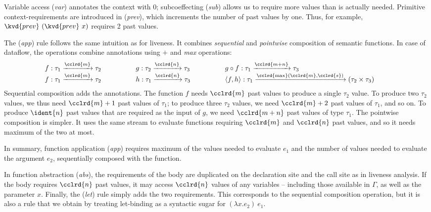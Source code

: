 Variable access (\emph{var}) annotates the context with $0$; subcoeffecting (\emph{sub}) allows
us to require more values than is actually needed. Primitive context-requirements are introduced
in (\emph{prev}), which increments the number of past values by one. Thus, for example,
$\kvd{prev}~(\kvd{prev}~x)$ requires 2 past values.

The (\emph{app}) rule follows the same intuition as for liveness. It combines \emph{sequential}
and \emph{pointwise} composition of semantic functions. In case of dataflow, the operations
combine annotations using $+$ and \emph{max} operations:
%
\begin{equation*}
\begin{array}{lll}
f : \tau_1 \xrightarrow{\cclrd{m}} \tau_2 \qquad\qquad&
g : \tau_2 \xrightarrow{\cclrd{n}} \tau_3 \qquad\qquad&
g \circ f : \tau_1 \xrightarrow{\cclrd{m+n}} \tau_3 \qquad\qquad
\\
f : \tau_1 \xrightarrow{\cclrd{m}} \tau_2 \qquad\qquad&
h : \tau_1 \xrightarrow{\cclrd{n}} \tau_3 \qquad\qquad&
\langle f, h \rangle : \tau_1 \xrightarrow{\cclrd{\textnormal{max}}(\cclrd{m}, \cclrd{s})} (\tau_2 \times \tau_3) \qquad
\end{array}
\end{equation*}
%
Sequential composition adds the annotations. The function $f$ needs $\cclrd{m}$ past values to
produce a single $\tau_2$ value. To produce two $\tau_2$ values, we thus need $\cclrd{m}+1$ past
values of $\tau_1$; to produce three $\tau_2$ values, we need $\cclrd{m}+2$ past values of $\tau_1$,
and so on. To produce $\ident{n}$ past values that are required as the input of $g$, we need
$\cclrd{m+n}$ past values of type $\tau_1$. The pointwise composition is simpler. It uses
the same stream to evaluate functions requiring $\cclrd{m}$ and $\cclrd{n}$ past values, and so it
needs maximum of the two at most.

In summary, function application (\emph{app}) requires maximum of the values needed to evaluate
$e_1$ and the number of values needed to evaluate the argument $e_2$, sequentially composed with
the function.

In function abstraction (\emph{abs}), the requirements of the body are duplicated on the declaration site
and the call site as in liveness analysis. If the body requires $\cclrd{n}$ past values, it may access
$\cclrd{n}$ values of any variables -- including those available in $\Gamma$, as well as the parameter
$x$. Finally, the (\emph{let}) rule simply adds the two requirements. This corresponds to the sequential
composition operation, but it is also a rule that we obtain by treating let-binding as a syntactic
sugar for $(\lambda x.e_2)~e_1$.

